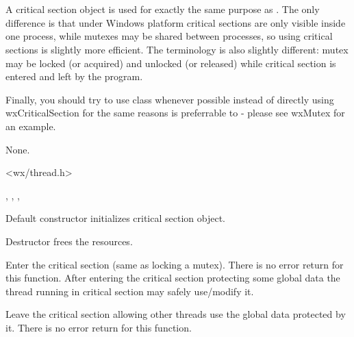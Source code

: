 \section{}\label{wxcriticalsection}

A critical section object is used for exactly the same purpose as 
. The only difference is that under Windows platform
critical sections are only visible inside one process, while mutexes may be
shared between processes, so using critical sections is slightly more
efficient. The terminology is also slightly different: mutex may be locked (or
acquired) and unlocked (or released) while critical section is entered and left
by the program.

Finally, you should try to use 
 class whenever
possible instead of directly using wxCriticalSection for the same reasons 
 is preferrable to 
 - please see wxMutex for an example.


None.


<wx/thread.h>


, , 
, 


\label{wxcriticalsectionctor}


Default constructor initializes critical section object.

\label{wxcriticalsectiondtor}


Destructor frees the resources.

\label{wxcriticalsectionenter}


Enter the critical section (same as locking a mutex). There is no error return
for this function. After entering the critical section protecting some global
data the thread running in critical section may safely use/modify it.

\label{wxcriticalsectionleave}


Leave the critical section allowing other threads use the global data protected
by it. There is no error return for this function.

